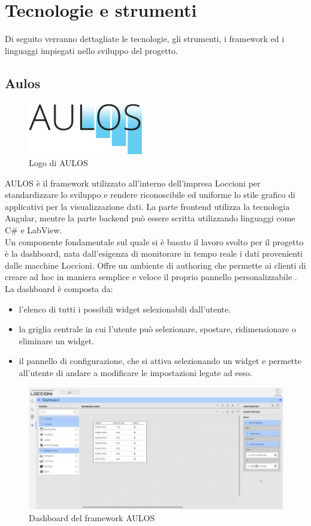 \chapter{Tecnologie e strumenti}
\label{chap:tecnologie_strumenti}
Di seguito verranno dettagliate le tecnologie, gli strumenti, i framework ed i linguaggi impiegati nello sviluppo del progetto.
\section{Aulos}
\label{chap:aulos}
\begin{figure}[h]
\begin{center}
  \includegraphics[width=5cm]{images/aulos_logo.png}
  \caption{Logo di AULOS}
\end{center}
\end{figure}
AULOS è il framework utilizzato all'interno dell'impresa Loccioni per standardizzare lo sviluppo e rendere riconoscibile ed uniforme lo stile grafico di applicativi per la visualizzazione dati. La parte frontend utilizza la tecnologia Angular, mentre la parte backend può essere scritta utilizzando linguaggi come C\# e LabView.\\
Un componente fondamentale sul quale si è basato il lavoro svolto per il progetto è la dashboard, nata dall'esigenza di monitorare in tempo reale i dati provenienti dalle macchine Loccioni. Offre un ambiente di authoring che permette ai clienti di creare ad hoc in maniera semplice e veloce il proprio pannello personalizzabile \cite{AULOS}.
La dashboard è composta da:
\begin{itemize}
    \item l'elenco di tutti i possibili widget selezionabili dall'utente.
    \item la griglia centrale in cui l'utente può selezionare, spostare, ridimensionare o eliminare un widget.
    \item il pannello di configurazione, che si attiva selezionando un widget e permette all'utente di andare a modificare le impostazioni legate ad esso. 
\end{itemize}
\begin{figure}[h]
\begin{center}
  \includegraphics[width=14cm]{images/dashboard_aulos.JPG}
  \caption{Dashboard del framework AULOS}
\end{center}
\end{figure}
